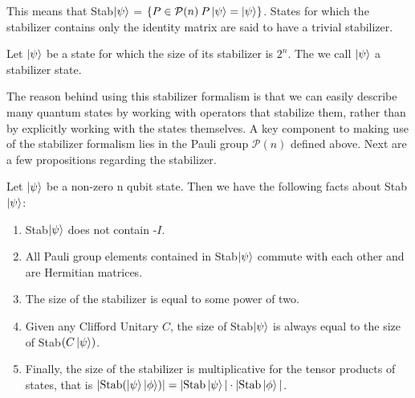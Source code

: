 \documentclass[12pt]{dalthesis}
\begin{document}
This means that Stab$\ket{\psi}$ = $\{P \in \mathcal{P}(n) \: P \ket{\psi} = \ket{\psi} \}$.  States for which the stabilizer contains only the identity matrix are said to have a trivial stabilizer. 

\begin{definition}
Let $\ket{\psi}$ be a state for which the size of its stabilizer is $2^n$. The we call $\ket{\psi}$ a stabilizer state.
\end{definition}

The reason behind using this stabilizer formalism is that we can easily describe many quantum states by working with operators that stabilize them, rather than by explicitly working with the states themselves. A key component to making use of the stabilizer formalism lies in the Pauli group $\mathcal{P}(n)$ defined above. Next are a few propositions regarding the stabilizer.

\begin{proposition}
\label{stabilizerfacts}
Let $\ket{\psi}$ be a non-zero n qubit state. Then we have the following facts about Stab$\ket{\psi}$:
\begin{enumerate}
\item Stab$\ket{\psi}$ does not contain -$I$.
\item All Pauli group elements contained in Stab$\ket{\psi}$ commute with each other and are Hermitian matrices.
\item The size of the stabilizer is equal to some power of two.
\item Given any Clifford Unitary $C$, the size of Stab$\ket{\psi}$ is always equal to the size of Stab$(C \ket{\psi})$.
\item Finally, the size of the stabilizer is multiplicative for the tensor products of states, that is $| \text{Stab} (\ket{\psi} \ket{\phi})| = |\text{Stab}\ket{\psi}| \cdot |\text{Stab}\ket{\phi}|$. 
\end{enumerate}
\end{proposition}
\end{document}
